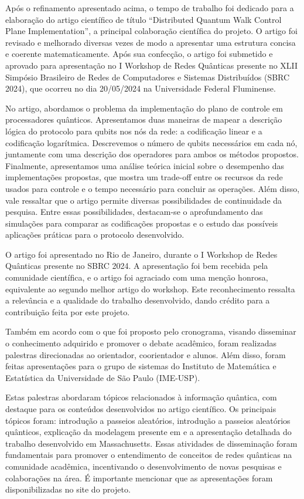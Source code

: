 \documentclass{article}
\begin{document}
    Após o refinamento apresentado acima, o tempo de trabalho foi dedicado para a elaboração do artigo científico de título ``Distributed Quantum Walk Control Plane Implementation'', a principal colaboração científica do projeto. O artigo foi revisado e melhorado diversas vezes de modo a apresentar uma estrutura concisa e coerente matematicamente. Após sua confecção, o artigo foi submetido e aprovado para apresentação no I Workshop de Redes Quânticas presente no XLII Simpósio Brasileiro de Redes de Computadores e Sistemas Distribuídos (SBRC 2024), que ocorreu no dia 20/05/2024 na Universidade Federal Fluminense.
    
    No artigo, abordamos o problema da implementação do plano de controle em processadores quânticos. Apresentamos duas maneiras de mapear a descrição lógica do protocolo \cite{universalcontrolplane} para qubits nos nós da rede: a codificação linear e a codificação logarítmica. Descrevemos o número de qubits necessários em cada nó, juntamente com uma descrição dos operadores para ambos os métodos propostos. Finalmente, apresentamos uma análise teórica inicial sobre o desempenho das implementações propostas, que mostra um trade-off entre os recursos da rede usados para controle e o tempo necessário para concluir as operações. Além disso, vale ressaltar que o artigo permite diversas possibilidades de continuidade da pesquisa. Entre essas possibilidades, destacam-se o aprofundamento das simulações para comparar as codificações propostas e o estudo das possíveis aplicações práticas para o protocolo desenvolvido. 
    
    O artigo foi apresentado no Rio de Janeiro, durante o I Workshop de Redes Quânticas presente no SBRC 2024. A apresentação foi bem recebida pela comunidade científica, e o artigo foi agraciado com uma menção honrosa, equivalente ao segundo melhor artigo do workshop. Este reconhecimento ressalta a relevância e a qualidade do trabalho desenvolvido, dando crédito para a contribuição feita por este projeto.
    
    Também em acordo com o que foi proposto pelo cronograma, visando disseminar o conhecimento adquirido e promover o debate acadêmico, foram realizadas palestras direcionadas ao orientador, coorientador e alunos. Além disso, foram feitas apresentações para o grupo de sistemas do Instituto de Matemática e Estatística da Universidade de São Paulo (IME-USP).
    
    Estas palestras abordaram tópicos relacionados à informação quântica, com destaque para os conteúdos desenvolvidos no artigo científico. Os principais tópicos foram: introdução a passeios aleatórios, introdução a passeios aleatórios quânticos, explicação da modelagem presente em \cite{universalcontrolplane} e a apresentação detalhada do trabalho desenvolvido em Massachusetts. Essas atividades de disseminação foram fundamentais para promover o entendimento de conceitos de redes quânticas na comunidade acadêmica, incentivando o desenvolvimento de novas pesquisas e colaborações na área. É importante mencionar que as apresentações foram disponibilizadas no site do projeto.
    
\end{document}
